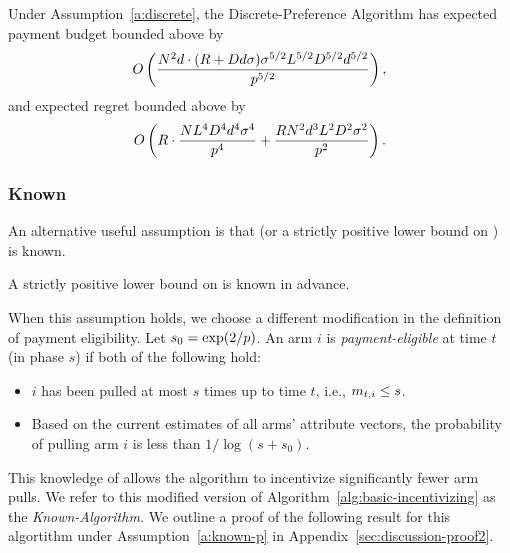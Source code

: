 \begin{theorem}
\label{rst:discrete}
Under Assumption~\ref{a:discrete}, the Discrete-Preference Algorithm has expected payment budget bounded above by 
\begin{align*}
O \left(\frac{N^2 d \cdot (R + D d \sigma)\sigma^{5/2}L^{5/2}D^{5/2}d^{5/2}}{p^{5/2}} \right),
\end{align*}
and expected regret bounded above by 
\begin{align}
O \left(R\cdot \frac{N L^4 D^4 d^4 \sigma^4}{p^4}
  + \frac{R N^2 d^3 L^2 D^2 \sigma^2}{p^2}
  \right).  \nonumber
\end{align}
\end{theorem}



\subsubsection{Known \MinProb}
An alternative useful assumption is that \MinProb (or a strictly positive lower bound on \MinProb) is known.

\begin{assumption}
\label{a:known-p}
A strictly positive lower bound on \MinProb is known in advance.
\end{assumption}

When this assumption holds, we choose a different modification in the definition of payment eligibility.
Let $s_0 = \exp(2/p)$.
An arm $i$ is \emph{payment-eligible} at time $t$ (in phase $s$)
if both of the following hold:
\begin{itemize}
\item $i$ has been pulled at most
$s$ times up to time $t$, i.e., $m_{t,i} \leq s$.
\item Based on the current estimates  of all arms' attribute vectors, the probability of pulling arm $i$ is less than $1/\log(s+s_0)$.
\end{itemize}

This knowledge of \MinProb allows the algorithm to incentivize
significantly fewer arm pulls.
We refer to this modified version of Algorithm~\ref{alg:basic-incentivizing} as the \emph{Known-\MinProb Algorithm.}
We outline a proof of the following result for this algortithm under Assumption~\ref{a:known-p} in Appendix~\ref{sec:discussion-proof2}.

